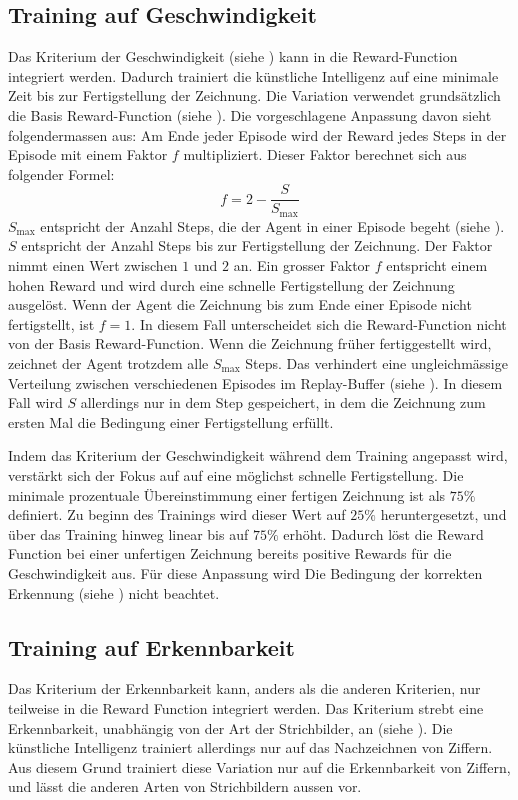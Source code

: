 \subsection{Training auf Geschwindigkeit}\label{sub:m_var_speed}
Das Kriterium der Geschwindigkeit (siehe ) kann in
die Reward-Function integriert werden. Dadurch trainiert die künstliche
Intelligenz auf eine minimale Zeit bis zur Fertigstellung der Zeichnung. Die
Variation verwendet grundsätzlich die Basis Reward-Function (siehe
). Die vorgeschlagene Anpassung davon sieht
folgendermassen aus: Am Ende jeder Episode wird der Reward jedes Steps in der
Episode mit einem Faktor $f$ multipliziert. Dieser Faktor berechnet sich aus
folgender Formel:
\[ f = 2 - \frac{S}{S_{\max}} \] 
$S_{\max}$ entspricht der Anzahl Steps, die der Agent in einer Episode begeht
(siehe ). $S$ entspricht der Anzahl Steps bis zur
Fertigstellung der Zeichnung. Der Faktor nimmt einen Wert zwischen $1$ und $2$
an. Ein grosser Faktor $f$ entspricht einem hohen Reward und wird durch eine
schnelle Fertigstellung der Zeichnung ausgelöst. Wenn der Agent die Zeichnung
bis zum Ende einer Episode nicht fertigstellt, ist $f = 1$. In diesem Fall unterscheidet sich die
Reward-Function nicht von der Basis Reward-Function. Wenn die Zeichnung früher
fertiggestellt wird, zeichnet der Agent trotzdem alle $S_{\max}$ Steps. Das
verhindert eine ungleichmässige Verteilung zwischen verschiedenen Episodes im
Replay-Buffer (siehe ). In diesem Fall wird $S$
allerdings nur in dem Step gespeichert, in dem die Zeichnung zum ersten Mal die
Bedingung einer Fertigstellung erfüllt.   

Indem das Kriterium der Geschwindigkeit während dem Training angepasst wird,
verstärkt sich der Fokus auf auf eine möglichst schnelle Fertigstellung. Die
minimale prozentuale Übereinstimmung einer fertigen Zeichnung ist als $75\%$
definiert. Zu beginn des Trainings wird dieser Wert auf $25\%$ heruntergesetzt,
und über das Training hinweg linear bis auf $75\%$ erhöht. Dadurch löst die
Reward Function bei einer unfertigen Zeichnung bereits positive Rewards für die
Geschwindigkeit aus. Für diese Anpassung wird Die Bedingung der korrekten
Erkennung (siehe ) nicht beachtet.


\subsection{Training auf Erkennbarkeit}
\label{sub:m_var_rec}
Das Kriterium der Erkennbarkeit kann, anders als die anderen Kriterien, nur
teilweise in die Reward Function integriert werden. Das Kriterium strebt eine
Erkennbarkeit, unabhängig von der Art der Strichbilder, an (siehe
). Die künstliche Intelligenz trainiert allerdings nur
auf das Nachzeichnen von Ziffern. Aus diesem Grund trainiert diese Variation nur
auf die Erkennbarkeit von Ziffern, und lässt die anderen Arten von Strichbildern
aussen vor. 

